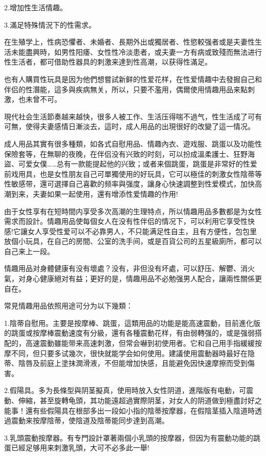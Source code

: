 \documentclass[12pt,UTF8]{ctexbook}
\begin{document}
2.增加性生活情趣。

3.滿足特殊情況下的性需求。

在生殖学上，性病恐懼者、未婚者、長期外出或獨居者、性慾較强者或是夫妻性生活未能盡興時，如男性阳痿、女性性冷淡患者，或夫妻一方有病或致殘而無法进行性生活者，都可借助性器具的刺激来達到性高潮，以获得性滿足。

也有人購買性玩具是因为他們想嘗試新鲜的性爱花样，在性爱情趣中去發掘自己和伴侣的性潛能，這多與疾病無关，所以，只要不濫用，偶爾使用情趣用品来點刺激，也未曾不可。

現代社会生活節奏越来越快，很多人被工作、生活压得喘不過气，性生活成了可有可無，使得夫妻感情日漸淡去，這时，成人用品的出現很好的改變了這一情况。

成人用品其實有很多種類，如各式自慰用品、情趣內衣、遊戏服、跳蛋以及功能性保險套等，在無聊的夜晚，在伴侣没有兴致的时刻，可以扮成溫柔護士、狂野海盜、可爱女僕……总有一款能提起他的兴致；或者来個跳蛋，跳蛋是非常好的性爱前戏用具，也是女性朋友自己可單獨使用的好玩具，它可以極佳的刺激女性陰蒂等性敏感带，還可選擇自己喜歡的频率與强度，讓身心快速調整到性爱模式，加快高潮到来，夫妻如果一起使用，還有增添性爱情趣的作用!

由于女性享有在短時間内享受多次高潮的生理特点，所以情趣用品多數都是为女性需求而設計。情趣用品使每個女人在没有性伴侣的情况下，可以利用它享受性快感!它讓女人享受性爱可以不必靠男人，不只能满足性自主，且有方便性，包包里放個小玩具，在自己的房間、公室的洗手间，或是百貨公司的五星級廁所，都可以自己来上一段。

情趣用品对身體健康有没有壞處？没有，非但没有坏處，可以舒压、解鬱、消火氣，对身心健康絕对有益；更好的是，情趣用品不必勉强男人配合，讓兩性關係更自在。

常見情趣用品依照用途可分为以下幾類：

1.陰蒂自慰用。主要是按摩棒、跳蛋，這類用品的功能是能高速震動，目前進化版的跳蛋或按摩棒震動速度有分級，還有各種震動花样，有由弱轉强的，或是强弱搭配的，高速震動雖能带来高速刺激，但常会嚇到初使用者。它和自己用手指緩緩按摩不同，但只要多试幾次，很快就能学会如何使用。建議使用震動器時最好在隐蒂、陰唇及前庭上塗抹潤滑液，不但能增加快感，且能避免因快速摩擦而受到傷害。

2.假陽具。多为長條型與阴茎擬真，使用時放入女性阴道，進階版有电動，可震動、伸縮，甚至旋轉龟頭，其功能遠超過實際阴茎，对女人的阴道做到極盡討好之能事！還有些假陽具在根部多出一段如小指的陰蒂按摩器，在假陰茎插入陰道時透過震動来按摩陰蒂，使陰道及陰蒂能同步達到高潮。

3.乳頭震動按摩器。有专門設計罩著兩個小乳頭的按摩器，但因为有震動功能的跳蛋已經足够用来刺激乳頭，大可不必多此一舉!
\end{document}
